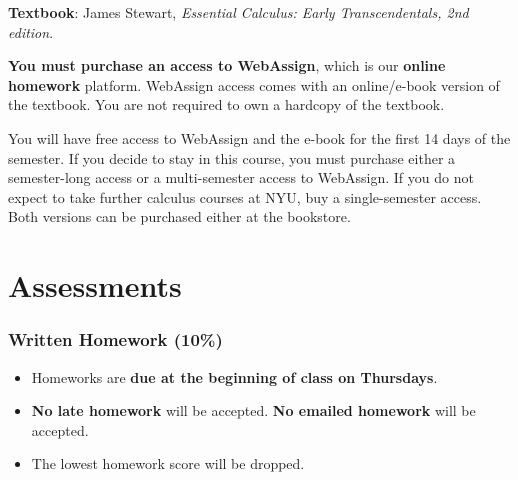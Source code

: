 \documentclass[10pt]{article}
\theoremstyle{definition}
\begin{document}
\textbf{Textbook}: James Stewart, \emph{Essential Calculus: Early Transcendentals, 2nd edition}.  

\vspace{0.2cm}

\noindent
\textbf{You must purchase an access to WebAssign}, which is our \textbf{online homework} platform. 
WebAssign access comes with an online/e-book version of the textbook.  You are not required to own a hardcopy of the textbook.

\vspace{0.2cm}

\noindent
You will have free access to WebAssign and the e-book for the first 14 days of the semester.  If you decide to stay in this course, you must purchase either a semester-long access or a multi-semester access to WebAssign.  If you do not expect to take further calculus courses at NYU, buy a single-semester access.  Both versions can be purchased either at the bookstore.

\section*{Assessments}


\subsubsection*{Written Homework (10\%)}

\begin{itemize}
\item Homeworks are \textbf{due at the beginning of class on Thursdays}.
\item \textbf{No late homework} will be accepted.  \textbf{No emailed homework} will be accepted.
\item The lowest homework score will be dropped.
\end{itemize}
\end{document}
